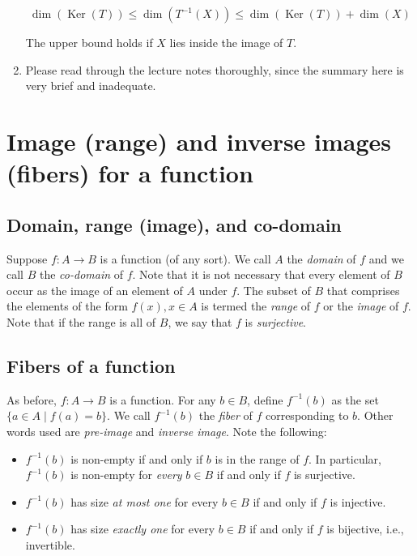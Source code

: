 \documentclass[10pt]{amsart}
\begin{document}
\begin{enumerate}
$$\operatorname{dim}(\operatorname{Ker}(T)) \le \operatorname{dim}(T^{-1}(X)) \le \operatorname{dim}(\operatorname{Ker}(T)) + \operatorname{dim}(X)$$

  The upper bound holds if $X$ lies inside the image of $T$.
\item Please read through the lecture notes thoroughly, since the
  summary here is very brief and inadequate.
\end{enumerate}


\section{Image (range) and inverse images (fibers) for a function}

\subsection{Domain, range (image), and co-domain}

Suppose $f:A \to B$ is a function (of any sort). We call $A$ the {\em
  domain} of $f$ and we call $B$ the {\em co-domain} of $f$. Note that
it is not necessary that every element of $B$ occur as the image of an
element of $A$ under $f$. The subset of $B$ that comprises the
elements of the form $f(x), x \in A$ is termed the {\em range} of $f$
or the {\em image} of $f$. Note that if the range is all of $B$, we
say that $f$ is {\em surjective}.

\subsection{Fibers of a function}

As before, $f: A \to B$ is a function. For any $b \in B$, define
$f^{-1}(b)$ as the set $\{ a \in A \mid f(a) = b \}$. We call
$f^{-1}(b)$ the {\em fiber} of $f$ corresponding to $b$. Other words
used are {\em pre-image} and {\em inverse image}. Note the following:

\begin{itemize}
\item $f^{-1}(b)$ is non-empty if and only if $b$ is in the range of
  $f$. In particular, $f^{-1}(b)$ is non-empty for {\em every} $b \in
  B$ if and only if $f$ is surjective.
\item $f^{-1}(b)$ has size {\em at most one} for every $b \in B$ if
  and only if $f$ is injective.
\item $f^{-1}(b)$ has size {\em exactly one} for every $b \in B$ if
  and only if $f$ is bijective, i.e., invertible.
\end{itemize}
\end{document}
